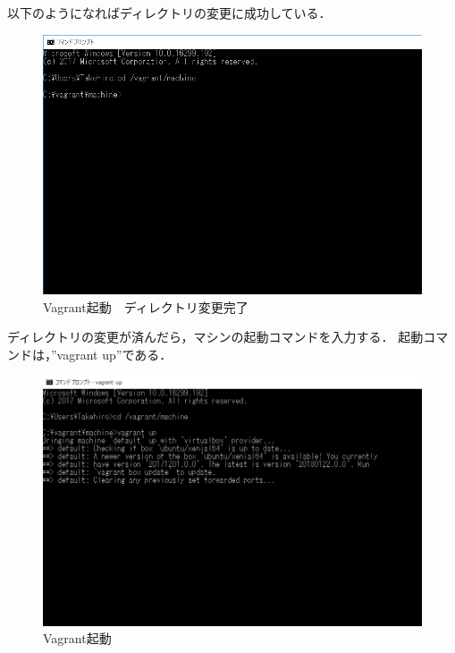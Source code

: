以下のようになればディレクトリの変更に成功している．

\begin{figure}[htb]
\centering
\includegraphics[width=13cm]{4-11.png}
\caption{Vagrant起動　ディレクトリ変更完了}\label{4-11}
\end{figure}
\newpage

ディレクトリの変更が済んだら，マシンの起動コマンドを入力する．
起動コマンドは，”vagrant up”である．
\begin{figure}[htb]
\centering
\includegraphics[width=13cm]{4-12.png}
\caption{Vagrant起動}\label{4-12}
\end{figure}
\newpage

